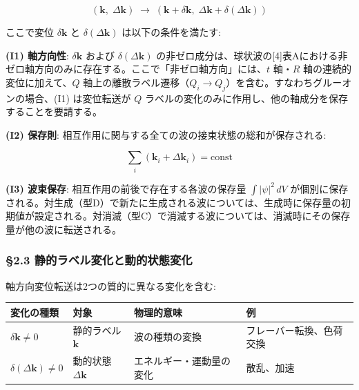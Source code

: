 \documentclass[
  a4paper,11pt]{ltjsarticle}
\newcounter{none}
\theoremstyle{definition}
\theoremstyle{remark}
\begin{document}
\[(\mathbf{k},\; \Delta\mathbf{k}) \;\longrightarrow\; (\mathbf{k} + \delta\mathbf{k},\; \Delta\mathbf{k} + \delta(\Delta\mathbf{k}))\]

ここで変位 \(\delta\mathbf{k}\) と \(\delta(\Delta\mathbf{k})\)
は以下の条件を満たす:

\textbf{(I1) 軸方向性}: \(\delta\mathbf{k}\) および
\(\delta(\Delta\mathbf{k})\)
の非ゼロ成分は、球状波の{[}4{]}表Aにおける非ゼロ軸方向のみに存在する。ここで「非ゼロ軸方向」には、\(t\)
軸・\(R\) 軸の連続的変位に加えて、\(Q\)
軸上の離散ラベル遷移（\(Q_i \to Q_j\)）を含む。すなわちグルーオンの場合、(I1)
は変位転送が \(Q\)
ラベルの変化のみに作用し、他の軸成分を保存することを要請する。

\textbf{(I2) 保存則}:
相互作用に関与する全ての波の接束状態の総和が保存される:

\[\sum_i (\mathbf{k}_i + \Delta\mathbf{k}_i) = \text{const}\]

\textbf{(I3) 波束保存}: 相互作用の前後で存在する各波の保存量
\(\int |\psi|^2 \, dV\)
が個別に保存される。対生成（型D）で新たに生成される波については、生成時に保存量の初期値が設定される。対消滅（型C）で消滅する波については、消滅時にその保存量が他の波に転送される。

\subsubsection{§2.3
静的ラベル変化と動的状態変化}\label{ux9759ux7684ux30e9ux30d9ux30ebux5909ux5316ux3068ux52d5ux7684ux72b6ux614bux5909ux5316}

軸方向変位転送は2つの質的に異なる変化を含む:

{\def\LTcaptype{none} %
\begin{longtable}[]{@{}
  >{\raggedright\arraybackslash}p{}
  >{\raggedright\arraybackslash}p{}
  >{\raggedright\arraybackslash}p{}
  >{\raggedright\arraybackslash}p{}@{}}
\toprule\noalign{}
\begin{minipage}[b]{\linewidth}\raggedright
変化の種類
\end{minipage} & \begin{minipage}[b]{\linewidth}\raggedright
対象
\end{minipage} & \begin{minipage}[b]{\linewidth}\raggedright
物理的意味
\end{minipage} & \begin{minipage}[b]{\linewidth}\raggedright
例
\end{minipage} \\
\midrule\noalign{}
\endhead
\bottomrule\noalign{}
\endlastfoot
\(\delta\mathbf{k} \neq 0\) & 静的ラベル \(\mathbf{k}\) & 波の種類の変換
& フレーバー転換、色荷交換 \\
\(\delta(\Delta\mathbf{k}) \neq 0\) & 動的状態 \(\Delta\mathbf{k}\) &
エネルギー・運動量の変化 & 散乱、加速 \\
\end{longtable}
}
\end{document}
